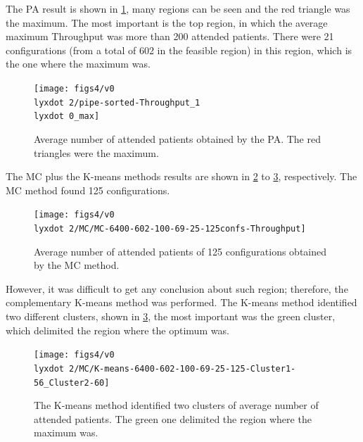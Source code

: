 The PA result is shown in \ref{subfig:pipe16-2}, many regions can
be seen and the red triangle was the maximum. The most important is
the top region, in which the average maximum Throughput was more than
200 attended patients. There were 21 configurations (from a total
of 602 in the feasible region) in this region, which is the one where
the maximum was.
\begin{figure}[H]
\centering{}\texttt{[image: figs4/v0\\lyxdot 2/pipe-sorted-Throughput\_1\\lyxdot 0\_max]}\caption{Average number of attended patients obtained by the PA. The red triangles
were the maximum.\label{subfig:pipe16-2}}
\end{figure}


The MC plus the K-means methods results are shown in \ref{subfig:mc16-2}
to \ref{subfig:km16-2}, respectively. The MC method found 125 configurations.
\begin{figure}[H]
\centering{}\texttt{[image: figs4/v0\\lyxdot 2/MC/MC-6400-602-100-69-25-125confs-Throughput]}\caption{Average number of attended patients of 125 configurations obtained
by the MC method. \label{subfig:mc16-2}}
\end{figure}
However, it was difficult to get any conclusion about such region;
therefore, the complementary K-means method was performed. The K-means
method identified two different clusters, shown in \ref{subfig:km16-2},
the most important was the green cluster, which delimited the region
where the optimum was.
\begin{figure}[H]
\begin{centering}
\texttt{[image: figs4/v0\\lyxdot 2/MC/K-means-6400-602-100-69-25-125-Cluster1-56\_Cluster2-60]}
\par\end{centering}

\caption{The K-means method identified two clusters of average number of attended
patients. The green one delimited the region where the maximum was.\label{subfig:km16-2}}
\end{figure}

